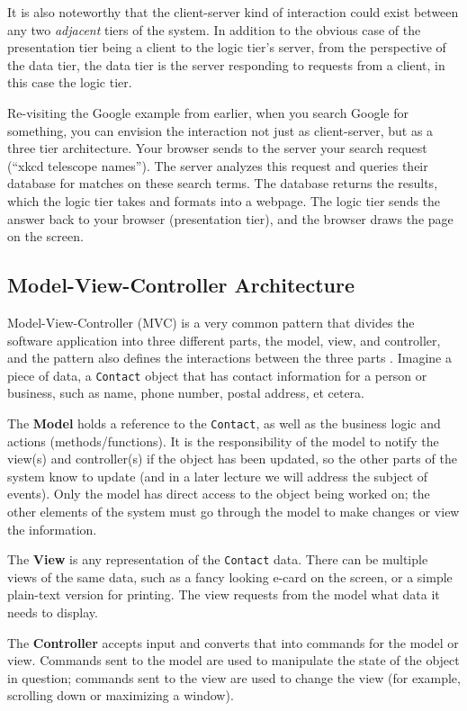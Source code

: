 It is also noteworthy that the client-server kind of interaction could exist between any two \textit{adjacent} tiers of the system. In addition to the obvious case of the presentation tier being a client to the logic tier's server, from the perspective of the data tier, the data tier is the server responding to requests from a client, in this case the logic tier.

Re-visiting the Google example from earlier, when you search Google for something, you can envision the interaction not just as client-server, but as a three tier architecture. Your browser sends to the server your search request (``xkcd telescope names''). The server analyzes this request and queries their database for matches on these search terms. The database returns the results, which the logic tier takes and formats into a webpage. The logic tier sends the answer back to your browser (presentation tier), and the browser draws the page on the screen.

\subsection*{Model-View-Controller Architecture}

Model-View-Controller (MVC) is a very common pattern that divides the software application into three different parts, the model, view, and controller, and the pattern also defines the interactions between the three parts \cite{posa}. Imagine a piece of data, a \texttt{Contact} object that has contact information for a person or business, such as name, phone number, postal address, et cetera. 


The \textbf{Model} holds a reference to the \texttt{Contact}, as well as the business logic and actions (methods/functions). It is the responsibility of the model to notify the view(s) and controller(s) if the object has been updated, so the other parts of the system know to update (and in a later lecture we will address the subject of events). Only the model has direct access to the object being worked on; the other elements of the system must go through the model to make changes or view the information.

The \textbf{View} is any representation of the \texttt{Contact} data. There can be multiple views of the same data, such as a fancy looking e-card on the screen, or a simple plain-text version for printing. The view requests from the model what data it needs to display.

The \textbf{Controller} accepts input and converts that into commands for the model or view. Commands sent to the model are used to manipulate the state of the object in question; commands sent to the view are used to change the view (for example, scrolling down or maximizing a window).

